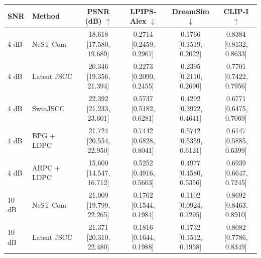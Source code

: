 \begin{tabular}{llcccc}
\toprule
SNR & Method & PSNR (dB) $\uparrow$ & LPIPS-Alex $\downarrow$ & DreamSim $\downarrow$ & CLIP-I $\uparrow$ \\
\midrule
4 dB & NeST-Com & \shortstack{18.618\\[17.580, 19.689]} & \shortstack{0.2714\\[0.2459, 0.2967]} & \shortstack{0.1766\\[0.1519, 0.2022]} & \shortstack{0.8384\\[0.8132, 0.8633]} \\
4 dB & Latent JSCC & \shortstack{20.346\\[19.356, 21.394]} & \shortstack{0.2273\\[0.2090, 0.2455]} & \shortstack{0.2395\\[0.2110, 0.2690]} & \shortstack{0.7701\\[0.7422, 0.7956]} \\
4 dB & SwinJSCC & \shortstack{22.392\\[21.233, 23.601]} & \shortstack{0.5737\\[0.5182, 0.6281]} & \shortstack{0.4292\\[0.3922, 0.4641]} & \shortstack{0.6771\\[0.6475, 0.7069]} \\
4 dB & BPG + LDPC & \shortstack{21.724\\[20.554, 22.950]} & \shortstack{0.7442\\[0.6828, 0.8041]} & \shortstack{0.5742\\[0.5359, 0.6121]} & \shortstack{0.6147\\[0.5885, 0.6399]} \\
4 dB & ARPC + LDPC & \shortstack{15.600\\[14.547, 16.712]} & \shortstack{0.5252\\[0.4916, 0.5603]} & \shortstack{0.4977\\[0.4580, 0.5356]} & \shortstack{0.6939\\[0.6647, 0.7245]} \\
\midrule
10 dB & NeST-Com & \shortstack{21.009\\[19.799, 22.265]} & \shortstack{0.1762\\[0.1544, 0.1984]} & \shortstack{0.1102\\[0.0924, 0.1295]} & \shortstack{0.8692\\[0.8463, 0.8910]} \\
10 dB & Latent JSCC & \shortstack{21.371\\[20.310, 22.480]} & \shortstack{0.1816\\[0.1644, 0.1988]} & \shortstack{0.1732\\[0.1512, 0.1958]} & \shortstack{0.8082\\[0.7786, 0.8349]} \\

\end{tabular}
